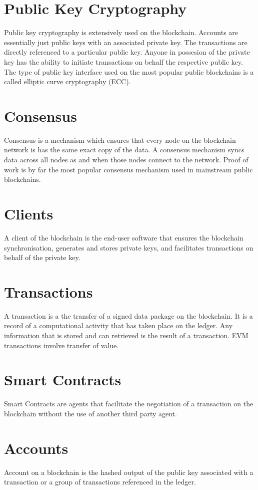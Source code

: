 \documentclass[a4paper,twoside,phd]{BYUPhys}
\begin{document}
\section{Public Key Cryptography}
Public key cryptography is extensively used on the blockchain. Accounts are essentially just public keys with an associated private key. The transactions are directly referenced to a particular public key. Anyone in possesion of the private key has the ability to initiate transactions on behalf the respective public key. The type of public key interface used on the most popular public blockchains is a called elliptic curve cryptography (ECC).
\section{Consensus}
Consensus is a mechanism which ensures that every node on the blockchain network is has the same exact copy of the data. A consensus mechanism syncs data across all nodes as and when those nodes connect to the network. Proof of work is by far the most popular consensus mechanism used in mainstream public blockchains. 
\section{Clients}
A client of the blockchain is the end-user software that ensures the blockchain synchronisation, generates and stores private keys, and facilitates transactions on behalf of the private key. 
\section{Transactions}
A transaction is a the transfer of a signed data package on the blockchain. It is a record of a computational activity that has taken place on the ledger. Any information that is stored and can retrieved is the result of a transaction. EVM transactions involve transfer of value. 
\section{Smart Contracts}
Smart Contracts are agents that facilitate the negotiation of a transaction on the blockchain without the use of another third party agent.

\section{Accounts}
Account on a blockchain is the hashed output of the public key associated with a transaction or a group of transactions referenced in the ledger.
\end{document}
